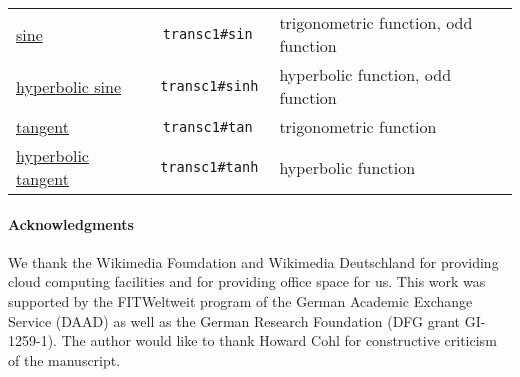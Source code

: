 \documentclass[a4paper]{article}
\begin{document}
\begin{table}[p]
\begin{tabular}{p{.23\linewidth}cp{.5\linewidth}}
\href{https://www.wikidata.org/entity/Q152415}{sine} &\texttt{ transc1\#sin }& trigonometric function, odd function \\
\href{https://www.wikidata.org/entity/Q1292101}{hyperbolic sine} &\texttt{ transc1\#sinh }& hyperbolic function, odd function \\
\href{https://www.wikidata.org/entity/Q1129196}{tangent} &\texttt{ transc1\#tan }& trigonometric function \\
\href{https://www.wikidata.org/entity/Q1274703}{hyperbolic tangent} &\texttt{ transc1\#tanh }& hyperbolic function \\
\end{tabular}
\end{table}

\paragraph*{Acknowledgments} We thank the Wikimedia Foundation and Wikimedia Deutschland for providing cloud computing facilities and for providing office space for us.
This work was supported by the FITWeltweit program of the German Academic Exchange Service (DAAD) as well as the German Research Foundation (DFG grant GI-1259-1).
The author would like to thank Howard Cohl for constructive criticism of the manuscript.
\printbibliography%
\end{document}
